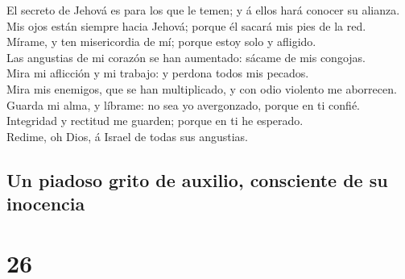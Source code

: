  El secreto de Jehová es para los que le temen; y á ellos
hará conocer su alianza.\\
 Mis ojos están siempre hacia Jehová; porque él sacará
mis pies de la red.\\
 Mírame, y ten misericordia de mí; porque estoy solo y
afligido.\\
 Las angustias de mi corazón se han aumentado: sácame de
mis congojas.\\
 Mira mi aflicción y mi trabajo: y perdona todos mis
pecados.\\
 Mira mis enemigos, que se han multiplicado, y con odio
violento me aborrecen.\\
 Guarda mi alma, y líbrame: no sea yo avergonzado, porque
en ti confié.\\
 Integridad y rectitud me guarden; porque en ti he
esperado.\\
 Redime, oh Dios, á Israel de todas sus angustias.

\hypertarget{un-piadoso-grito-de-auxilio-consciente-de-su-inocencia}{%
\subsection{Un piadoso grito de auxilio, consciente de su
inocencia}\label{un-piadoso-grito-de-auxilio-consciente-de-su-inocencia}}

\hypertarget{section-25}{%
\section{26}\label{section-25}}


